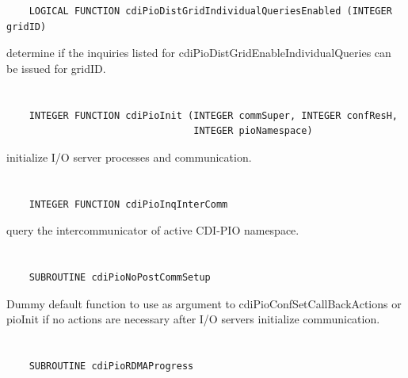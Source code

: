 \begin{verbatim}
    LOGICAL FUNCTION cdiPioDistGridIndividualQueriesEnabled (INTEGER gridID)
\end{verbatim}

determine if the inquiries
listed for cdiPioDistGridEnableIndividualQueries can be issued for
gridID.


\section*{\tt {}}

\begin{verbatim}
    INTEGER FUNCTION cdiPioInit (INTEGER commSuper, INTEGER confResH,
                                 INTEGER pioNamespace)
\end{verbatim}

initialize I/O server processes and communication.


\section*{\tt {}}

\begin{verbatim}
    INTEGER FUNCTION cdiPioInqInterComm
\end{verbatim}

query the intercommunicator of active CDI-PIO
namespace.


\section*{\tt {}}

\begin{verbatim}
    SUBROUTINE cdiPioNoPostCommSetup
\end{verbatim}

Dummy default function to use as argument to
cdiPioConfSetCallBackActions or pioInit
if no actions are necessary after I/O servers initialize communication.


\section*{\tt {}}

\begin{verbatim}
    SUBROUTINE cdiPioRDMAProgress
\end{verbatim}

